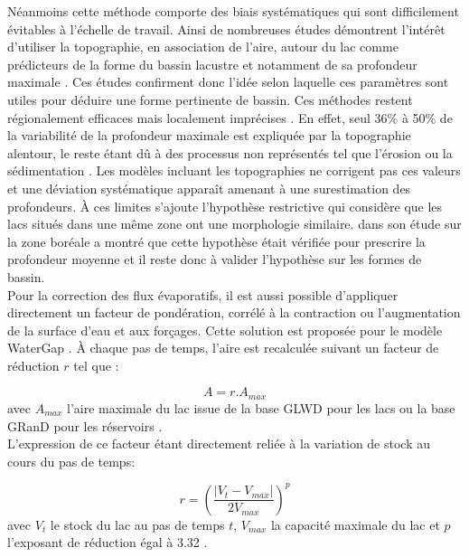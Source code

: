 Néanmoins cette méthode comporte des biais systématiques qui sont difficilement évitables à l'échelle de travail. Ainsi de nombreuses études démontrent l'intérêt d'utiliser la topographie, en association de l'aire, autour du lac comme prédicteurs de la forme du bassin lacustre et notamment de sa profondeur maximale \citep{sobek2011, hollister2010}. Ces études confirment donc l'idée selon laquelle ces paramètres sont utiles pour déduire une forme pertinente de bassin. Ces méthodes restent régionalement efficaces mais localement imprécises \citep{oliver2016}. En effet, seul 36\% à 50\% de la variabilité de la profondeur maximale est expliquée par la topographie alentour, le reste étant dû à des processus non représentés tel que l'érosion ou la sédimentation \citep{hollister2011}. Les modèles incluant les topographies ne corrigent pas ces valeurs et une déviation systématique apparaît amenant à une surestimation des profondeurs. À ces limites s'ajoute l'hypothèse restrictive qui considère que les lacs situés dans une même zone ont une morphologie similaire. \citet{choulga2014} dans son étude sur la zone boréale a montré que cette hypothèse était vérifiée pour prescrire la profondeur moyenne et il reste donc à valider l'hypothèse sur les formes de bassin.\\

Pour la correction des flux évaporatifs, il est aussi possible d'appliquer directement un facteur de pondération, corrélé à la contraction ou l'augmentation de la surface d'eau et aux forçages. Cette solution est proposée pour le modèle WaterGap \citep{muller2020}. À chaque pas de temps, l'aire est recalculée suivant un facteur de réduction $r$ tel que :

\begin{equation}
A = r . A_{max}
\end{equation}
avec $A_{max}$ l'aire maximale du lac issue de la base GLWD \citep{lehner2004} pour les lacs ou la base GRanD pour les réservoirs \citep{lehner2011}.\\

\noindent L'expression de ce facteur étant directement reliée à la variation de stock au cours du pas de temps:

\begin{equation}
r = \left(\dfrac{|V_{t}-V_{max}|}{2V_{max}}\right)^p
\end{equation}
avec $V_t$ le stock du lac au pas de temps $t$, $V_{max}$ la capacité maximale du lac et $p$ l'exposant de réduction égal à 3.32 \citep{muller2014}.\\

